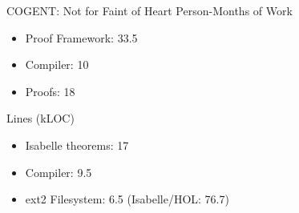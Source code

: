 \documentclass[aspectratio=169]{beamer}
\begin{document}
%


\begin{frame}{COGENT: Not for Faint of Heart}
Person-Months of Work
    \begin{itemize}
        \item Proof Framework: 33.5
        \item Compiler: 10
        \item Proofs: 18 
    \end{itemize}
Lines (kLOC)
    \begin{itemize}
        \item Isabelle theorems: 17
        \item Compiler: 9.5 
        \item ext2 Filesystem: 6.5 (Isabelle/HOL: 76.7) 
    \end{itemize}
\end{frame}
\end{document}
